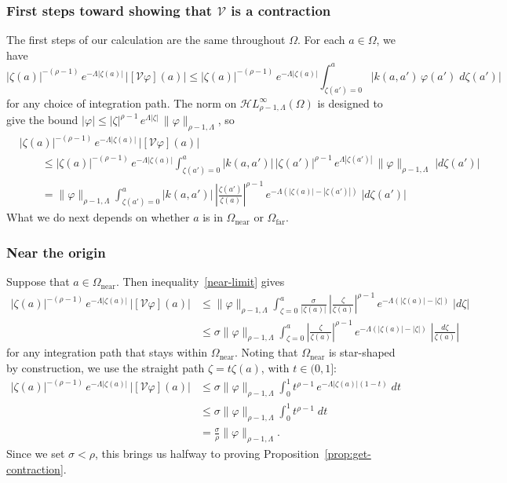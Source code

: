 \documentclass{article}
\theoremstyle{definition}
\theoremstyle{plain}
\newcommand{\singexp}[2]{\mathcal{H}L^\infty_{#1, #2}}
\newcommand{\volterra}{\mathcal{V}}
\newcommand{\domain}{\Omega}
\newcommand{\near}{\Omega_\text{near}}
\newcommand{\far}{\Omega_\text{far}}
\newenvironment{revtwo}{\color{revred}}{\color{black}}
\newenvironment{revtwo}{}{}
\begin{document}
\subsubsection{First steps toward showing that $\volterra$ is a contraction}\label{first-steps}
The first steps of our calculation are the same throughout $\domain$. For each $a \in \domain$, we have
\begin{revtwo}
\[ |\zeta(a)|^{-(\rho-1)}\,e^{-\Lambda|\zeta(a)|}\,\big|[\volterra\varphi](a)\big| \le |\zeta(a)|^{-(\rho-1)}\,e^{-\Lambda|\zeta(a)|}  \int_{\zeta(a') = 0}^a |k(a, a')\,\varphi(a')\;d\zeta(a')| \]
\end{revtwo}
for any choice of integration path. The norm on $\singexp{\rho-1}{\Lambda}(\domain)$ is designed to give the bound $|\varphi| \le |\zeta|^{\rho-1}\,e^{\Lambda |\zeta|}\,\|\varphi\|_{\rho-1, \Lambda}$, so
\begin{revtwo}
\begin{align*}
&|\zeta(a)|^{-(\rho-1)}\,e^{-\Lambda|\zeta(a)|}\,\big|[\volterra\varphi](a)\big| \\
& \qquad \le |\zeta(a)|^{-(\rho-1)}\,e^{-\Lambda|\zeta(a)|}  \int_{\zeta(a') = 0}^a |k(a, a')|\,|\zeta(a')|^{\rho-1}\,e^{\Lambda |\zeta(a')|}\,\|\varphi\|_{\rho-1, \Lambda}\;|d\zeta(a')| \\
& \qquad = \|\varphi\|_{\rho-1, \Lambda}  \int_{\zeta(a') = 0}^a |k(a, a')|\,\left|\frac{\zeta(a')}{\zeta(a)}\right|^{\rho-1}\,e^{-\Lambda(|\zeta(a)| - |\zeta(a')|)}\;|d\zeta(a')|
\end{align*}
\end{revtwo}
What we do next depends on whether $a$ is in $\near$ or $\far$.
\subsubsection{Near the origin}\label{near-bound}
Suppose that $a \in \near$. Then inequality~\eqref{near-limit} gives
\begin{align*}
|\zeta(a)|^{-(\rho-1)}\,e^{-\Lambda|\zeta(a)|}\,\big|[\volterra\varphi](a)\big| & \le
\|\varphi\|_{\rho-1, \Lambda}  \int_{\zeta = 0}^a \frac{\sigma}{|\zeta(a)|}\,\left|\frac{\zeta}{\zeta(a)}\right|^{\rho-1}\,e^{-\Lambda(|\zeta(a)| - |\zeta|)}\;|d\zeta| \\
& \le \sigma \|\varphi\|_{\rho-1, \Lambda}  \int_{\zeta = 0}^a \left|\frac{\zeta}{\zeta(a)}\right|^{\rho-1}\,e^{-\Lambda(|\zeta(a)| - |\zeta|)}\;\left|\frac{d\zeta}{\zeta(a)}\right|
\end{align*}
for any integration path that stays within $\near$. Noting that $\near$ is star-shaped by construction, we use the straight path $\zeta = t \zeta(a)$, with $t \in (0, 1]$:
\begin{align*}
|\zeta(a)|^{-(\rho-1)}\,e^{-\Lambda|\zeta(a)|}\,\big|[\volterra\varphi](a)\big| & \le \sigma \|\varphi\|_{\rho-1, \Lambda} \int_0^1 t^{\rho-1}\,e^{-\Lambda |\zeta(a)|(1 - t)}\;dt \\
& \le \sigma \|\varphi\|_{\rho-1, \Lambda} \int_0^1 t^{\rho-1}\;dt \\
& = \frac{\sigma}{\rho} \|\varphi\|_{\rho-1, \Lambda}.
\end{align*}
Since we set $\sigma < \rho$, this brings us halfway to proving Proposition~\ref{prop:get-contraction}.
\end{document}
